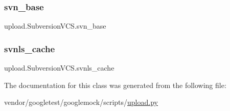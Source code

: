 \subsubsection{\texorpdfstring{svn\+\_\+base}{svn\_base}}
{\footnotesize\ttfamily upload.\+Subversion\+V\+C\+S.\+svn\+\_\+base}

\mbox{\label{classupload_1_1_subversion_v_c_s_aa801782f807674b06f491df5d7ca9942}} 
\subsubsection{\texorpdfstring{svnls\+\_\+cache}{svnls\_cache}}
{\footnotesize\ttfamily upload.\+Subversion\+V\+C\+S.\+svnls\+\_\+cache}



The documentation for this class was generated from the following file\+:\begin{DoxyCompactItemize}
\item 
vendor/googletest/googlemock/scripts/\hyperlink{googlemock_2scripts_2upload_8py}{upload.\+py}\end{DoxyCompactItemize}
